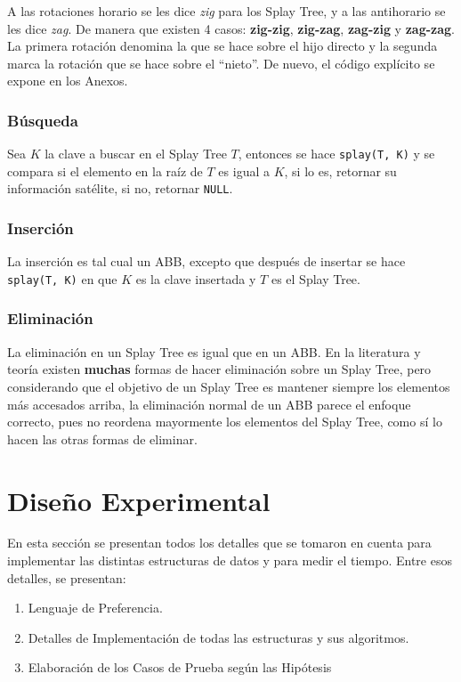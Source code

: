\documentclass[12pt,letterpaper]{report}
\begin{document}
A las rotaciones horario se les dice \emph{zig} para los Splay Tree, y a las antihorario se les dice \emph{zag}. De manera que existen 4 casos: \textbf{zig-zig}, \textbf{zig-zag}, \textbf{zag-zig} y \textbf{zag-zag}. La primera rotación denomina la que se hace sobre el hijo directo y la segunda marca la rotación que se hace sobre el ``nieto''. De nuevo, el código explícito se expone en los Anexos.


\subsubsection{Búsqueda}
Sea $K$ la clave a buscar en el Splay Tree $T$, entonces se hace \texttt{splay(T, K)} y se compara si el elemento en la raíz de $T$ es igual a $K$, si lo es, retornar su información satélite, si no, retornar \texttt{NULL}.

\subsubsection{Inserción}
La inserción es tal cual un ABB, excepto que después de insertar se hace \texttt{splay(T, K)} en que $K$ es la clave insertada y $T$ es el Splay Tree.

\subsubsection{Eliminación}
La eliminación en un Splay Tree es igual que en un ABB. En la literatura y teoría existen \textbf{muchas} formas de hacer eliminación sobre un Splay Tree, pero considerando que el objetivo de un Splay Tree es mantener siempre los elementos más accesados arriba, la eliminación normal de un ABB parece el enfoque correcto, pues no reordena mayormente los elementos del Splay Tree, como sí lo hacen las otras formas de eliminar.



\newpage
\section{Diseño Experimental}
En esta sección se presentan todos los detalles que se tomaron en cuenta para implementar las distintas estructuras de datos y para medir el tiempo. Entre esos detalles, se presentan:
\begin{enumerate}
\item Lenguaje de Preferencia.
\item Detalles de Implementación de todas las estructuras y sus algoritmos.
\item Elaboración de los Casos de Prueba según las Hipótesis
\end{enumerate}
\end{document}
